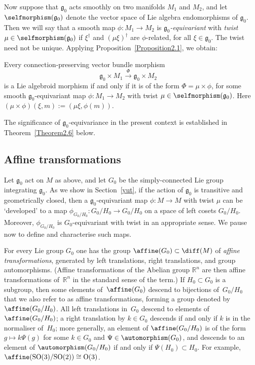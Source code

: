 Now suppose that ${\mathfrak g}_0 $ acts smoothly on two manifolds
$M_1$ and $M_2$, and let $\selfmorphism({\mathfrak g}_0)$ denote the
vector space of Lie algebra endomorphisms of ${\mathfrak g}_0$. Then
we will say that a smooth map $\phi \colon M_1 \rightarrow M_2$ is
{\it ${\mathfrak g}_0$-equivariant} with {\it twist
  $\mu\in\selfmorphism({\mathfrak g}_0)$} if $\xi^\dagger$ and $(\mu
\xi)^\dagger$ are $\phi $-related, for all $\xi\in {\mathfrak g}_0
$. The twist need not be unique.  Applying Proposition~\ref{Proposition2.1}, we
obtain:

\begin{PropositionBlaom}\label{Proposition2.2}
  Every connection-preserving vector bundle morphism
  \[
  {\mathfrak g}_0
  \times M_1 \xrightarrow{\Phi} {\mathfrak g}_0 \times M_2
  \]
 is a Lie
  algebroid morphism if and only if it is of the form $\Phi=\mu \times
  \phi$, for some smooth ${\mathfrak g}_0$-equivariant map $\phi
  \colon M_1 \rightarrow M_2$ with twist $\mu \in
  \selfmorphism({\mathfrak g}_0)$. Here $(\mu \times \phi)(\xi,m):=(\mu \xi,\phi(m))$.
\end{PropositionBlaom}


The signif\/icance of ${\mathfrak g}_0$-equivariance in the present
context is established in Theorem~\ref{Theorem2.6} below.

\subsection{Af\/f\/ine transformations}\label{affine}
Let ${\mathfrak g}_0$ act on $M$ as above, and let $G_0$ be the
simply-connected Lie group integrating ${\mathfrak g}_0$. As we show
in Section~\ref{yut}, if the action of ${\mathfrak g}_0$ is transitive and
geometrically closed, then a ${\mathfrak g}_0$-equivariant map $\phi
\colon M \rightarrow M$ with twist $\mu$ can be `developed' to a map
$\phi_{G_0/H_0} \colon G_0/H_0 \rightarrow G_0/H_0$ on a space of left
cosets $G_0/H_0$. Moreover, $\phi_{G_0/H_0}$ is $G_0$-equivariant with
twist in an appropriate sense. We pause now to def\/ine and characterise
such maps.

For every Lie group $G_0$ one has the group $\affine(G_0)\subset
\diff(M)$ of {\it affine transformations}, generated by left
translations, right translations, and group automorphisms. (Af\/f\/ine
transformations of the Abelian group ${\mathbb R}^n$ are then af\/f\/ine
transformations of~${\mathbb R}^n $ in the standard sense of the
term.) If $H_0 \subset G_0$ is a subgroup, then some elements of~$\affine(G_0)$ descend to bijections of~$G_0/H_0$ that we also refer
to as af\/f\/ine transformations, forming a group denoted by
$\affine(G_0/H_0)$. All left translations in~$G_0$ descend to elements
of $\affine(G_0/H_0)$; a right translation by $k \in G_0$ descends if
and only if $k$ is in the normaliser of~$H_0$; more generally, an
element of $\affine(G_0/H_0)$ is of the form $g \mapsto k\Psi(g)$ for
some $k \in G_0$ and $\Psi \in \automorphism(G_0)$, and descends to an
element of $\automorphism(G_0/H_0)$ if and only if $\Psi(H_0) \subset
H_0$. For example, $\affine({\rm SO}(3)/{\rm SO}(2))\cong
{\rm O}(3)$.

